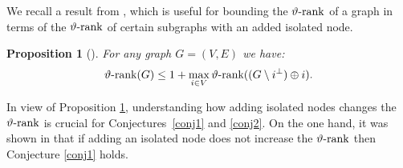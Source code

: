 \documentclass[11pt]{article}
\newcommand{\ignore}[1]{}
\newtheorem{proposition}[theorem]{Proposition}
\numberwithin{equation}{section}
\newcommand{\MK}{{\mathcal K}}
\newcommand{\rrank}{\vartheta\text{\rm -rank}}
\begin{document}
We recall a result  from \cite{GL2007}, which is useful  for bounding the $\rrank$ of a graph in terms of the $\rrank$ of certain subgraphs with an added isolated node.
\begin{proposition}[\cite{GL2007}]\label{propGL}
For any graph  $G=(V,E)$ we have:
\begin{equation}
\rrank(G)\leq 1 + \max_{i\in V} \rrank((G\setminus i^\perp) \oplus i).
\end{equation}
\end{proposition}
\ignore{
\begin{proof}\footnote{The proof will only be given in the arXiv version}
Set $G_i:= G\setminus i^\perp \oplus K_{i^\perp}$. By Lemma \ref{twin_n}, we have $\rrank(G_i) = \rrank(G\setminus i^\perp \oplus i)$. 
Assume that $M_{G_i}\in \MK_n^{(r-1)}$ for all $i\in V$, we need to prove that $M_G\in \MK^{(r)}_n$.
Note that each  matrix $$P(i):=M_{G_i} + (\alpha(G)-\alpha(G_i)) (I+A_{G_i}) = \alpha(G)(I+A_{G_i}) -J$$ belongs to $\MK_{n}^{(r-1)}$, since it is the sum of two matrices in $\MK_{n}^{(r-1)}$ as  $\alpha(G)-\alpha(G_i)\ge 0$. 
We have 
$$\begin{array}{l}
\displaystyle \Big(\sum_i x_i^2\Big)^r (x^{\circ 2})^T M_Gx^{\circ 2} \\
= \displaystyle \Big(\sum_i x_i^2\Big)^{r-1}\Big( \sum_i x_i^2 (x^{\circ 2})^T P(i) x^{\circ 2}
+\sum_i x_i^2 (x^{\circ 2})^T (M_G-P(i)) x^{\circ 2}\Big)\\
=\displaystyle  \sum_i x_i^2 \Big(\underbrace{(\sum_i x_i^2)^{r-1} (x^{\circ 2})^T P(i) x^{\circ 2}}_{=\sigma_1} \Big)
+ \Big(\sum_i x_i^2\Big)^{r-1}\Big( \underbrace{\sum_i x_i^2 (x^{\circ 2})^T (M_G-P(i)) x^{\circ 2}}_{=\sigma_2}\Big).
\end{array}
$$
We show that this polynomial is a sum of squares, thus showing $M_G\in\MK^{(r)}_n$. Indeed,   $\sigma_1\in \Sigma$ since each $P(i)$ belongs to $\MK^{(r-1)}_n$.
In addition, one can check that the matrices $P(i)$ satisfy the conditions (ii)-(iv) of Lemma \ref{lemK1}. Then, using the identity (\ref{eqpM})  we obtain that $\sigma_2$ has nonnegative coefficients, and thus $\sigma_2\in\Sigma$, which
 concludes the proof.
\end{proof}
}
In view of Proposition \ref{propGL},  understanding how adding isolated nodes changes the $\rrank$ is crucial for Conjectures~\ref{conj1} and \ref{conj2}. On the one hand, it was shown in \cite{GL2007} that if adding an isolated node does not increase the $\rrank$ then Conjecture \ref{conj1} holds.
\end{document}
